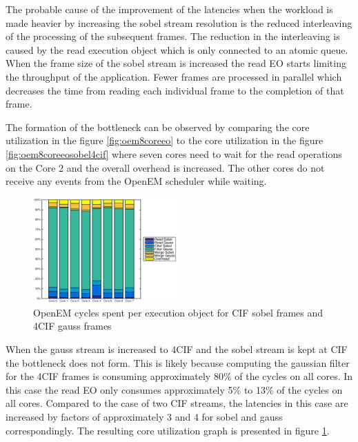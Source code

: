 The probable cause of the improvement of the latencies when the workload is made heavier by increasing the sobel stream resolution is the reduced interleaving of the processing of the subsequent frames. The reduction in the interleaving is caused by the read execution object which is only connected to an atomic queue. When the frame size of the sobel stream is increased the read EO starts limiting the throughput of the application. Fewer frames are processed in parallel which decreases the time from reading each individual frame to the completion of that frame.

The formation of the bottleneck can be observed by comparing the core utilization in the figure \ref{fig:oem8coreeo} to the core utilization in the figure \ref{fig:oem8coreeosobel4cif} where seven cores need to wait for the read operations on the Core 2 and the overall overhead is increased. The other cores do not receive any events from the OpenEM scheduler while waiting.

\begin{figure}[h]
    \begin{center}
        \includegraphics[width=0.49\textwidth]{images/openem_sobelcif_gauss4cif_eo.eps}
        \caption{OpenEM cycles spent per execution object for CIF sobel frames
        and 4CIF gauss frames}
        \label{fig:oem8coreeogauss4cif}
    \end{center}
\end{figure}

When the gauss stream is increased to 4CIF and the sobel stream is kept at CIF the bottleneck does not form. This is likely because computing the gaussian filter for the 4CIF frames is consuming approximately 80\% of the cycles on all cores. In this case the read EO only consumes approximately 5\% to 13\% of the cycles on all cores. Compared to the case of two CIF streams, the latencies in this case are increased by factors of approximately 3 and 4 for sobel and gauss correspondingly. The resulting core utilization graph is presented in figure \ref{fig:oem8coreeogauss4cif}.

\FloatBarrier
